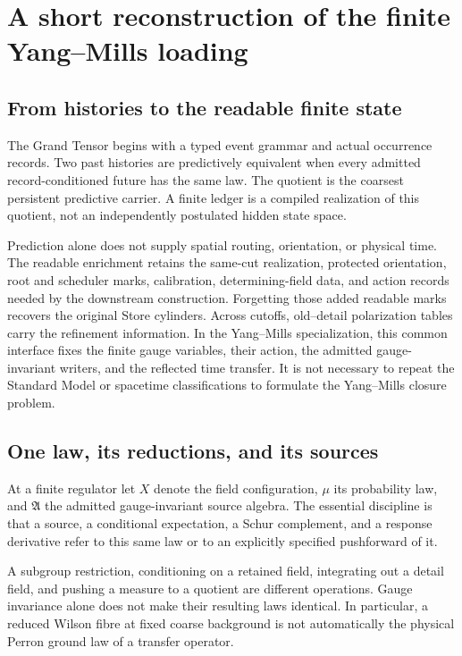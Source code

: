 \documentclass[11pt,oneside,openany]{book}
\theoremstyle{definition}
\theoremstyle{remark}
\begin{document}
\chapter{A short reconstruction of the finite Yang--Mills loading}
\label{ch:finite}
\section{From histories to the readable finite state}
The Grand Tensor begins with a typed event grammar and actual occurrence records. Two past histories are predictively equivalent when every admitted record-conditioned future has the same law. The quotient is the coarsest persistent predictive carrier. A finite ledger is a compiled realization of this quotient, not an independently postulated hidden state space.

Prediction alone does not supply spatial routing, orientation, or physical time. The readable enrichment retains the same-cut realization, protected orientation, root and scheduler marks, calibration, determining-field data, and action records needed by the downstream construction. Forgetting those added readable marks recovers the original Store cylinders. Across cutoffs, old--detail polarization tables carry the refinement information. In the Yang--Mills specialization, this common interface fixes the finite gauge variables, their action, the admitted gauge-invariant writers, and the reflected time transfer. It is not necessary to repeat the Standard Model or spacetime classifications to formulate the Yang--Mills closure problem. \cite{GT}

\section{One law, its reductions, and its sources}
At a finite regulator let $X$ denote the field configuration, $\mu$ its probability law, and $\mathfrak A$ the admitted gauge-invariant source algebra. The essential discipline is that a source, a conditional expectation, a Schur complement, and a response derivative refer to this same law or to an explicitly specified pushforward of it.

A subgroup restriction, conditioning on a retained field, integrating out a detail field, and pushing a measure to a quotient are different operations. Gauge invariance alone does not make their resulting laws identical. In particular, a reduced Wilson fibre at fixed coarse background is not automatically the physical Perron ground law of a transfer operator.
\end{document}
